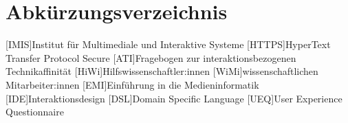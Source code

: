 
\cleardoublepage
{}
\chapter*{Abkürzungsverzeichnis}
\label{section-abbrevs}

\begin{acronym}[Companion]
  [IMIS]{Institut für Multimediale und Interaktive Systeme}
  [HTTPS]{HyperText Transfer Protocol Secure}
  [ATI]{Fragebogen zur interaktionsbezogenen Technikaffinität}
  [HiWi]{Hilfswissenschaftler:innen}
  [WiMi]{wissenschaftlichen Mitarbeiter:innen}
  [EMI]{Einführung in die Medieninformatik}
  [IDE]{Interaktionsdesign}
  [DSL]{Domain Specific Language}
  [UEQ]{User Experience Questionnaire}  
\end{acronym}
